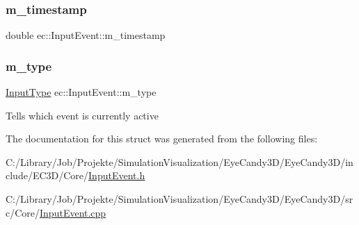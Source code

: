 \mbox{\label{structec_1_1_input_event_ada54908facf585cb714bd6712d8f6c4d}} 
\subsubsection{\texorpdfstring{m\+\_\+timestamp}{m\_timestamp}}
{\footnotesize\ttfamily double ec\+::\+Input\+Event\+::m\+\_\+timestamp}

\mbox{\label{structec_1_1_input_event_a07aadaf18da2952478b803bbd4122bb7}} 
\subsubsection{\texorpdfstring{m\+\_\+type}{m\_type}}
{\footnotesize\ttfamily \mbox{\hyperlink{namespaceec_ae2d697393ea83b34b18ab14eb5dacbca}{Input\+Type}} ec\+::\+Input\+Event\+::m\+\_\+type}

Tells which event is currently active 

The documentation for this struct was generated from the following files\+:\begin{DoxyCompactItemize}
\item 
C\+:/\+Library/\+Job/\+Projekte/\+Simulation\+Visualization/\+Eye\+Candy3\+D/\+Eye\+Candy3\+D/include/\+E\+C3\+D/\+Core/\mbox{\hyperlink{_input_event_8h}{Input\+Event.\+h}}\item 
C\+:/\+Library/\+Job/\+Projekte/\+Simulation\+Visualization/\+Eye\+Candy3\+D/\+Eye\+Candy3\+D/src/\+Core/\mbox{\hyperlink{_input_event_8cpp}{Input\+Event.\+cpp}}\end{DoxyCompactItemize}
